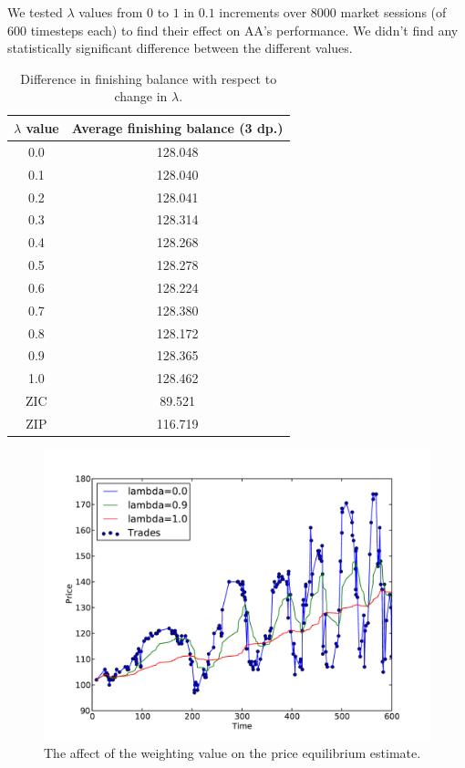 \documentclass[preprint]{acm_proc_article-sp} %
\begin{document}
We tested $\lambda$ values from $0$ to $1$ in $0.1$ increments over 8000
market sessions (of 600 timesteps each) to find their effect on AA's
performance. We didn't find any statistically significant difference between
the different values. 

\begin{table}[H]
  \centering
  \begin{tabular}{ | c | c | }
    \hline
    \textbf{$\lambda$ value} & \textbf{Average finishing balance (3 dp.)} \\
    \hline
        0.0 & 128.048 \\
        0.1 & 128.040 \\
        0.2 & 128.041 \\
        0.3 & 128.314 \\
        0.4 & 128.268 \\
        0.5 & 128.278 \\
        0.6 & 128.224 \\
        0.7 & 128.380 \\
        0.8 & 128.172 \\
        0.9 & 128.365 \\
        1.0 & 128.462 \\
    \hline \hline
        ZIC &  89.521 \\
        ZIP & 116.719 \\
    \hline
  \end{tabular}
  \caption{Difference in finishing balance with respect to change in $\lambda$.}
  \label{tbl:lambda_results}
\end{table}

\begin{figure}[H]
  \centering
  \includegraphics[width=\columnwidth]{graphs_and_stats/graph_equilibriums.pdf}
  \caption{The affect of the weighting value on the price equilibrium
  \label{fig:equilibrium}
  estimate.}
\end{figure}
\end{document}
